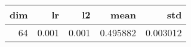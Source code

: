 \begin{tabular}{rrrrr}
\toprule
 dim &     lr &     l2 &      mean &       std \\
\midrule
  64 &  0.001 &  0.001 &  0.495882 &  0.003012 \\
\bottomrule
\end{tabular}
